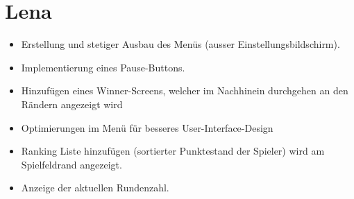 \documentclass[10pt,a4paper]{article}
\begin{document}
	\section*{Lena}
		\begin{itemize}
			\item Erstellung und stetiger Ausbau des Men\"us (ausser Einstellungsbildschirm).
			\item Implementierung eines Pause-Buttons.
			\item Hinzuf\"ugen eines Winner-Screens, welcher im Nachhinein durchgehen an den R\"andern angezeigt wird
			\item Optimierungen im Men\"u f\"ur besseres User-Interface-Design
			\item Ranking Liste hinzuf\"ugen (sortierter Punktestand der Spieler) wird am Spielfeldrand angezeigt.
			\item Anzeige der aktuellen Rundenzahl.
		\end{itemize}
\end{document}
